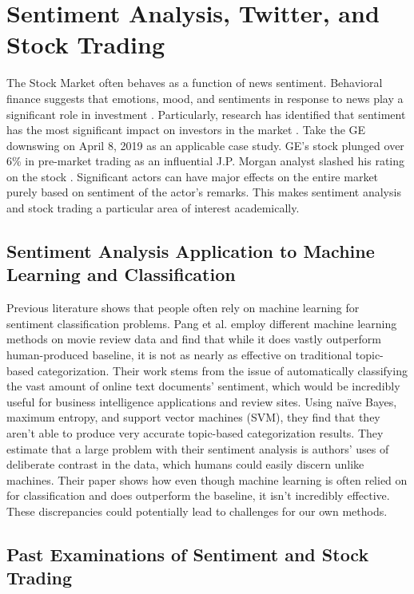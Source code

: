 \documentclass[../thesis.tex]{subfiles}
\begin{document}
\section{Sentiment Analysis, Twitter, and Stock Trading}

The Stock Market often behaves as a function of news sentiment. Behavioral finance suggests that emotions, mood, and sentiments in response to news play a significant role in investment \cite{Ho2016}. Particularly, research has identified that sentiment has the most significant impact on investors in the market \cite{Ho2016}. Take the GE downswing on April 8, 2019 as an applicable case study. GE's stock plunged over 6\% in pre-market trading as an influential J.P. Morgan analyst slashed his rating on the stock \cite{Sozzi2019}. Significant actors can have major effects on the entire market purely based on sentiment of the actor's remarks. This makes sentiment analysis and stock trading a particular area of interest academically. 


\subsection{Sentiment Analysis Application to Machine Learning and Classification}

Previous literature shows that people often rely on machine learning for sentiment classification problems. Pang et al. \cite{Pang} employ different machine learning methods on movie review data and find that while it does vastly outperform human-produced baseline, it is not as nearly as effective on traditional topic-based categorization. Their work stems from the issue of automatically classifying the vast amount of online text documents' sentiment, which would be incredibly useful for business intelligence applications and review sites. Using na\"{i}ve Bayes, maximum entropy, and support vector machines (SVM), they find that they aren't able to produce very accurate topic-based categorization results. They estimate that a large problem with their sentiment analysis is authors' uses of deliberate contrast in the data, which humans could easily discern unlike machines. Their paper shows how even though machine learning is often relied on for classification and does outperform the baseline, it isn't incredibly effective. These discrepancies could potentially lead to challenges for our own methods. 


\subsection{Past Examinations of Sentiment and Stock Trading}
\end{document}
